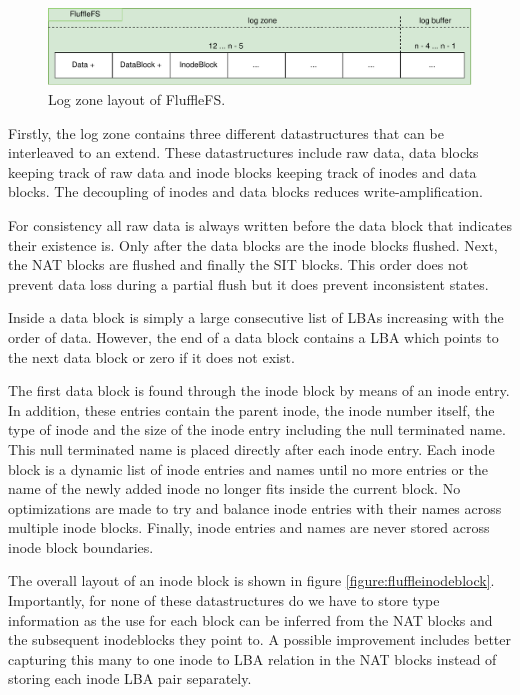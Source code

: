 \begin{figure}[h!]
    \centering
	\includegraphics[width=1\textwidth]{resources/images/fluffle-layout-log.pdf}
	\caption{Log zone layout of FluffleFS.}
    \label{figure:flufflelayoutlog}
\end{figure}

Firstly, the log zone contains three different datastructures that can be
interleaved to an extend. These datastructures include raw data, data blocks
keeping track of raw data and inode blocks keeping track of inodes and data
blocks. The decoupling of inodes and data blocks reduces write-amplification.

For consistency all raw data is always written before the data block that
indicates their existence is. Only after the data blocks are the inode blocks
flushed. Next, the NAT blocks are flushed and finally the SIT blocks. This order
does not prevent data loss during a partial flush but it does prevent
inconsistent states.

Inside a data block is simply a large consecutive list of LBAs increasing
with the order of data. However, the end of a data block contains a LBA which
points to the next data block or zero if it does not exist.

The first data block is found through the inode block by means of an inode
entry. In addition, these entries contain the parent inode, the inode number
itself, the type of inode and the size of the inode entry including the null
terminated name. This null terminated name is placed directly after each
inode entry. Each inode block is a dynamic list of inode entries and names
until no more entries or the name of the newly added inode no longer fits
inside the current block. No optimizations are made to try and balance inode
entries with their names across multiple inode blocks. Finally, inode entries
and names are never stored across inode block boundaries.

The overall layout of an inode block is shown in figure
\ref{figure:fluffleinodeblock}. Importantly, for none of these datastructures
do we have to store type information as the use for each block can be inferred
from the NAT blocks and the subsequent inodeblocks they point to.
A possible improvement includes better capturing this many to one inode to LBA
relation in the NAT blocks instead of storing each inode LBA pair separately.

